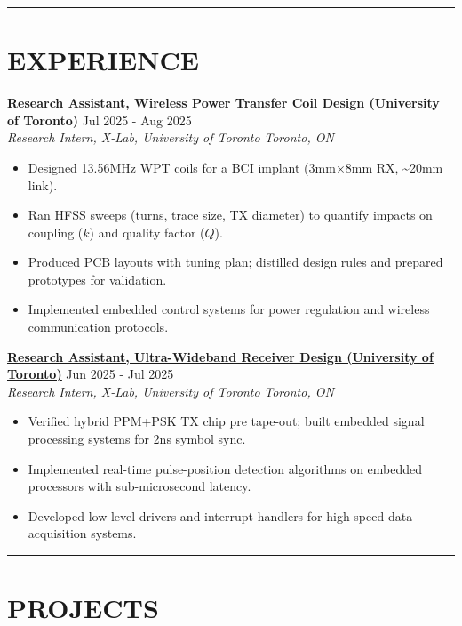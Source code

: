 \documentclass[letterpaper,10pt]{article}
\begin{document}
\noindent\rule{\linewidth}{1pt}

\section*{\textbf{EXPERIENCE}}

\noindent\textbf{Research Assistant, Wireless Power Transfer Coil Design (University of Toronto)} \hfill Jul 2025 - Aug 2025\\
\textit{Research Intern, X-Lab, University of Toronto} \hfill \textit{Toronto, ON}
\begin{itemize}[leftmargin=0.2in]
    \item Designed 13.56MHz WPT coils for a BCI implant (3mm×8mm RX, \textasciitilde20mm link).
    \item Ran HFSS sweeps (turns, trace size, TX diameter) to quantify impacts on coupling ($k$) and quality factor ($Q$).
    \item Produced PCB layouts with tuning plan; distilled design rules and prepared prototypes for validation.
    \item Implemented embedded control systems for power regulation and wireless communication protocols.
\end{itemize}

\vspace{0.2cm}
\noindent\href{https://github.com/Ken-2511/ppm-psk-visualize}
{\uline{\textbf{Research Assistant, Ultra-Wideband Receiver Design (University of Toronto)}}} \hfill Jun 2025 - Jul 2025\\
\textit{Research Intern, X-Lab, University of Toronto} \hfill \textit{Toronto, ON}
\begin{itemize}[leftmargin=0.2in]
    \item Verified hybrid PPM+PSK TX chip pre tape-out; built embedded signal processing systems for 2ns symbol sync.
	\item Implemented real-time pulse-position detection algorithms on embedded processors with sub-microsecond latency.
    \item Developed low-level drivers and interrupt handlers for high-speed data acquisition systems.
\end{itemize}

\noindent\rule{\linewidth}{1pt}

\section*{\textbf{PROJECTS}}
\end{document}
